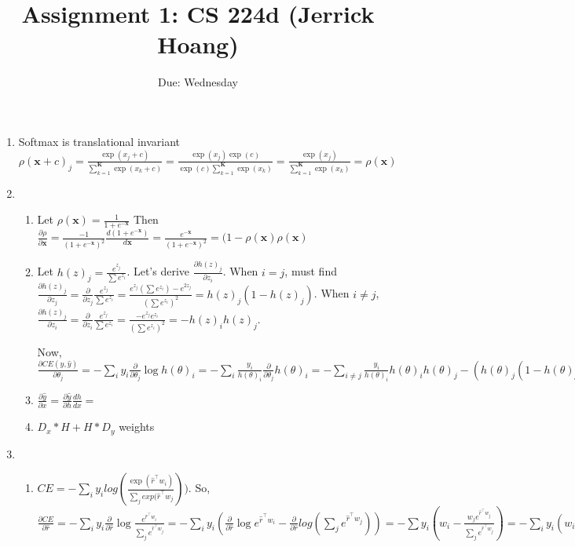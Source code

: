 \documentclass{article}
\title{Assignment 1: CS 224d (Jerrick Hoang)}
\date{Due: Wednesday }
\begin{document}
\maketitle

\begin{enumerate}
\item Softmax is translational invariant
$\rho(\pmb{x} + c)_j = \frac{\exp(x_j + c)}{\sum_{k=1}^{\pmb{K}} \exp(x_k + c)} = \frac{\exp(x_j)\exp(c)}{\exp(c)\sum_{k=1}^{\pmb{K}}\exp(x_k)} = \frac{\exp(x_j)}{\sum_{k=1}^{\pmb{K}}\exp(x_k)} = \rho(\pmb{x})$

\item 
\begin{enumerate}
\item 
Let $\rho(\pmb{x}) = \frac{1}{1 + e^{-\pmb{x}}}$
Then $\frac{\partial \rho}{\partial \pmb{x}} = \frac{-1}{(1+e^{-\pmb{x}})^2} \frac{d (1 + e^{-\pmb{x}})}{d \pmb{x}} = \frac{e^{-\pmb{x}}}{(1 + e^{-\pmb{x}})^2} = (1-\rho(\pmb{x})\rho(\pmb{x})$
\item Let $h(z)_j = \frac{e^{z_j}}{\sum e^{z_i}}$. Let's derive $\frac{\partial h(z)_j}{\partial z_i}$. When $i = j$, must find $\frac{\partial h(z)_j}{\partial z_j} = \frac{\partial}{\partial z_j} \frac{e^{z_j}}{\sum e^{z_i}} = \frac{e^{z_j}(\sum e^{z_i}) - e^{2z_j}}{(\sum e^{z_i})^2} = h(z)_j ( 1 - h(z)_j)$. When $i \neq j$, $\frac{\partial h(z)_j}{\partial z_i} = \frac{\partial}{\partial z_i} \frac{e^{z_j}}{\sum e^{z_i}} = \frac{-e^{z_j}e^{z_i}}{(\sum e^{z_i})^2} = -h(z)_ih(z)_j$. 

Now, $\frac{\partial CE(y, \hat{y})}{\partial \theta_j} = - \sum_i y_i \frac{\partial}{\partial \theta_j} \log h(\theta)_i = - \sum_i \frac{y_i}{h(\theta)_i} \frac{\partial}{\partial \theta_j} h(\theta)_i = - \sum_{i\neq j} \frac{y_i}{h(\theta)_i}h(\theta)_ih(\theta)_j - (h(\theta)_j ( 1 - h(\theta)_j)) = - h(\theta)_j (\sum_{i\neq j} y_i + 1 - h(\theta)_j)$ 

\item $\frac{\partial \hat{y}}{\partial x} = \frac{\partial \hat{y}}{\partial h} \frac{dh}{dx} = $

\item $D_x * H + H * D_y$ weights 
\end{enumerate}

\item 
\begin{enumerate}
\item $CE = - \sum_i y_i log(\frac{\exp(\hat{r}^{\intercal}w_i)}{\sum_j exp(\hat{r}^{\intercal}w_j}))$. So, $\frac{\partial CE}{\partial \hat{r}} = -\sum_i y_i \frac{\partial}{\partial \hat{r}} \log \frac{e^{\hat{r}^{\intercal}w_i}}{\sum_j e^{\hat{r}^{\intercal}w_j}} = -\sum_i y_i(\frac{\partial}{\partial \hat{r}}\log e^{\hat{r}^{\intercal}w_i} - \frac{\partial}{\partial \hat{r}} log(\sum_j e^{\hat{r}^{\intercal}w_j})) = - \sum y_i (w_i - \frac{w_je^{\hat{r}^{\intercal}w_j}}{\sum_j e^{\hat{r}^{\intercal}w_j}}) = - \sum_i y_i (w_i - \sum_j w_j Pr(word_j | \hat{r}, w))$


\end{enumerate}
\end{enumerate}
\end{document}

